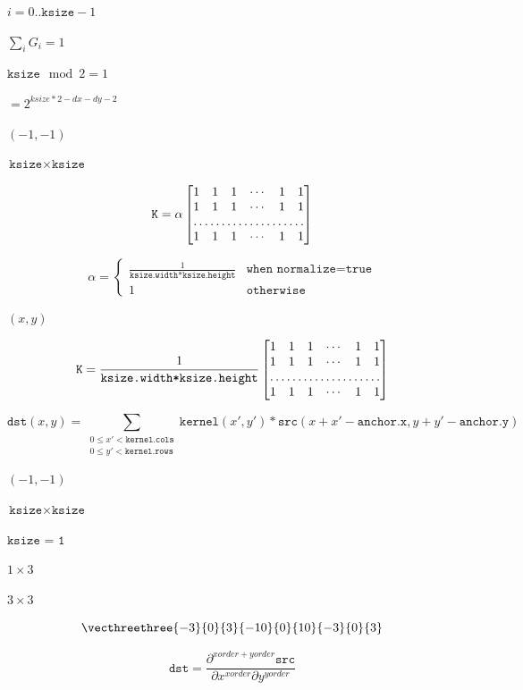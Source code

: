 \documentclass{article}
\begin{document}
$i=0..\texttt{ksize}-1$
\pagebreak

$\sum_i G_i=1$
\pagebreak

$\texttt{ksize} \mod 2 = 1$
\pagebreak

$=2^{ksize*2-dx-dy-2}$
\pagebreak

$(-1, -1)$
\pagebreak

$\texttt{ksize} \times
\texttt{ksize}$
\pagebreak

\[\texttt{K} =  \alpha \begin{bmatrix} 1 & 1 & 1 &  \cdots & 1 & 1  \\ 1 & 1 & 1 &  \cdots & 1 & 1  \\ \hdotsfor{6} \\ 1 & 1 & 1 &  \cdots & 1 & 1 \end{bmatrix}\]
\pagebreak

\[\alpha = \begin{cases} \frac{1}{\texttt{ksize.width*ksize.height}} & \texttt{when } \texttt{normalize=true}  \\1 & \texttt{otherwise}\end{cases}\]
\pagebreak

$ (x, y) $
\pagebreak

\[\texttt{K} =  \frac{1}{\texttt{ksize.width*ksize.height}} \begin{bmatrix} 1 & 1 & 1 &  \cdots & 1 & 1  \\ 1 & 1 & 1 &  \cdots & 1 & 1  \\ \hdotsfor{6} \\ 1 & 1 & 1 &  \cdots & 1 & 1  \\ \end{bmatrix}\]
\pagebreak

\[\texttt{dst} (x,y) =  \sum _{ \substack{0\leq x' < \texttt{kernel.cols}\\{0\leq y' < \texttt{kernel.rows}}}}  \texttt{kernel} (x',y')* \texttt{src} (x+x'- \texttt{anchor.x} ,y+y'- \texttt{anchor.y} )\]
\pagebreak

$(-1,-1)$
\pagebreak

$\texttt{ksize} \times \texttt{ksize}$
\pagebreak

$\texttt{ksize = 1}$
\pagebreak

$1 \times 3$
\pagebreak

$3\times3$
\pagebreak

\[\vecthreethree{-3}{0}{3}{-10}{0}{10}{-3}{0}{3}\]
\pagebreak

\[\texttt{dst} =  \frac{\partial^{xorder+yorder} \texttt{src}}{\partial x^{xorder} \partial y^{yorder}}\]
\pagebreak
\end{document}
